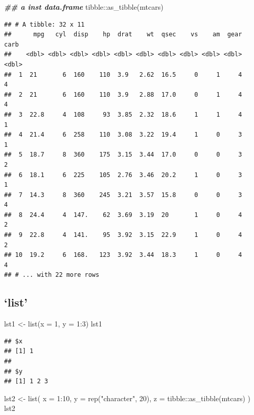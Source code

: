\documentclass[
]{article}
\newenvironment{Shaded}{\begin{snugshade}}{\end{snugshade}}
\newcommand{\AttributeTok}[1]{\textcolor[rgb]{0.77,0.63,0.00}{#1}}
\newcommand{\DecValTok}[1]{\textcolor[rgb]{0.00,0.00,0.81}{#1}}
\newcommand{\DocumentationTok}[1]{\textcolor[rgb]{0.56,0.35,0.01}{\textbf{\textit{#1}}}}
\newcommand{\FunctionTok}[1]{\textcolor[rgb]{0.00,0.00,0.00}{#1}}
\newcommand{\NormalTok}[1]{#1}
\newcommand{\OtherTok}[1]{\textcolor[rgb]{0.56,0.35,0.01}{#1}}
\newcommand{\SpecialCharTok}[1]{\textcolor[rgb]{0.00,0.00,0.00}{#1}}
\newcommand{\StringTok}[1]{\textcolor[rgb]{0.31,0.60,0.02}{#1}}
\begin{document}
\begin{Shaded}
\begin{Highlighting}[]
\DocumentationTok{\#\# a inst data.frame}
\NormalTok{tibble}\SpecialCharTok{::}\FunctionTok{as\_tibble}\NormalTok{(mtcars)}
\end{Highlighting}
\end{Shaded}

\begin{verbatim}
## # A tibble: 32 x 11
##      mpg   cyl  disp    hp  drat    wt  qsec    vs    am  gear  carb
##    <dbl> <dbl> <dbl> <dbl> <dbl> <dbl> <dbl> <dbl> <dbl> <dbl> <dbl>
##  1  21       6  160    110  3.9   2.62  16.5     0     1     4     4
##  2  21       6  160    110  3.9   2.88  17.0     0     1     4     4
##  3  22.8     4  108     93  3.85  2.32  18.6     1     1     4     1
##  4  21.4     6  258    110  3.08  3.22  19.4     1     0     3     1
##  5  18.7     8  360    175  3.15  3.44  17.0     0     0     3     2
##  6  18.1     6  225    105  2.76  3.46  20.2     1     0     3     1
##  7  14.3     8  360    245  3.21  3.57  15.8     0     0     3     4
##  8  24.4     4  147.    62  3.69  3.19  20       1     0     4     2
##  9  22.8     4  141.    95  3.92  3.15  22.9     1     0     4     2
## 10  19.2     6  168.   123  3.92  3.44  18.3     1     0     4     4
## # ... with 22 more rows
\end{verbatim}

\hypertarget{list}{%
\subsection{`list'}\label{list}}

\begin{Shaded}
\begin{Highlighting}[]
\NormalTok{lst1 }\OtherTok{\textless{}{-}} \FunctionTok{list}\NormalTok{(}\AttributeTok{x =} \DecValTok{1}\NormalTok{, }\AttributeTok{y =} \DecValTok{1}\SpecialCharTok{:}\DecValTok{3}\NormalTok{)}
\NormalTok{lst1}
\end{Highlighting}
\end{Shaded}

\begin{verbatim}
## $x
## [1] 1
## 
## $y
## [1] 1 2 3
\end{verbatim}

\begin{Shaded}
\begin{Highlighting}[]
\NormalTok{lst2 }\OtherTok{\textless{}{-}} \FunctionTok{list}\NormalTok{(}
  \AttributeTok{x =} \DecValTok{1}\SpecialCharTok{:}\DecValTok{10}\NormalTok{, }
  \AttributeTok{y =} \FunctionTok{rep}\NormalTok{(}\StringTok{"character"}\NormalTok{, }\DecValTok{20}\NormalTok{), }\AttributeTok{z =}\NormalTok{ tibble}\SpecialCharTok{::}\FunctionTok{as\_tibble}\NormalTok{(mtcars)}
\NormalTok{)}
\NormalTok{lst2}
\end{Highlighting}
\end{Shaded}
\end{document}
